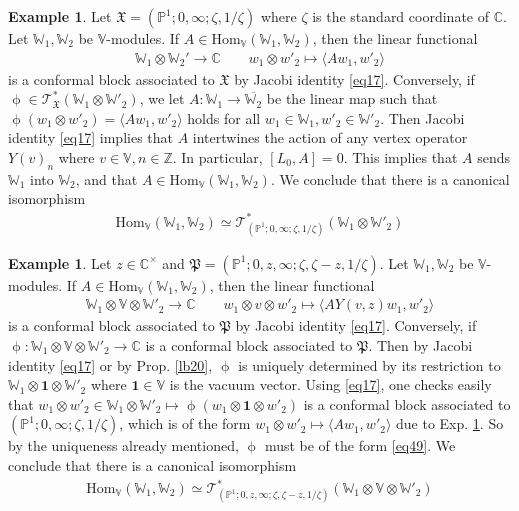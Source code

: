 \documentclass[11pt,b5paper,notitlepage]{article}
\theoremstyle{definition}
\newtheorem{eg}[df]{Example}
\theoremstyle{plain}
\newcommand{\fk}{\mathfrak}
\newcommand{\ovl}{\overline}
\newcommand{\id}{\mathbf{1}}
\newcommand{\Hom}{\mathrm{Hom}}
\newcommand{\bk}[1]{\langle {#1}\rangle}
\newcommand{\scr}{\mathscr}
\newcommand{\Vbb}{\mathbb V}
\newcommand{\Wbb}{\mathbb W}
\newcommand{\Cbb}{\mathbb C}
\newcommand{\Zbb}{\mathbb Z}
\newcommand{\Pbb}{\mathbb P}
\numberwithin{equation}{section}
\begin{document}
\begin{eg}\label{lb30}
Let $\fk X=(\Pbb^1;0,\infty;\zeta,1/\zeta)$ where $\zeta$ is the standard coordinate of $\Cbb$. Let $\Wbb_1,\Wbb_2$ be $\Vbb$-modules. If $A\in\Hom_\Vbb(\Wbb_1,\Wbb_2)$, then the linear functional
\begin{align*}
\Wbb_1\otimes\Wbb_2'\rightarrow\Cbb\qquad w_1\otimes w'_2\mapsto\bk{Aw_1,w'_2}
\end{align*}
is a conformal block associated to $\fk X$ by  Jacobi identity \eqref{eq17}. Conversely, if $\upphi\in\scr T_{\fk X}^*(\Wbb_1\otimes\Wbb'_2)$, we let $A:\Wbb_1\rightarrow \ovl{\Wbb_2}$ be the linear map such that $\upphi(w_1\otimes w'_2)=\bk{Aw_1,w'_2}$ holds for all $w_1\in\Wbb_1,w'_2\in\Wbb'_2$. Then Jacobi identity \eqref{eq17} implies that $A$ intertwines the action of any vertex operator $Y(v)_n$ where $v\in\Vbb,n\in\Zbb$. In particular, $[L_0,A]=0$. This implies that $A$ sends $\Wbb_1$ into $\Wbb_2$, and that $A\in\Hom_\Vbb(\Wbb_1,\Wbb_2)$. We conclude that there is a canonical isomorphism
\begin{align*}
\Hom_\Vbb(\Wbb_1,\Wbb_2)\simeq \scr T_{(\Pbb^1;0,\infty;\zeta,1/\zeta)}^*(\Wbb_1\otimes\Wbb'_2)
\end{align*}
\end{eg}


\begin{eg}\label{lb31}
Let $z\in\Cbb^\times$ and $\fk P=(\Pbb^1;0,z,\infty;\zeta,\zeta-z,1/\zeta)$. Let $\Wbb_1,\Wbb_2$ be $\Vbb$-modules. If $A\in\Hom_\Vbb(\Wbb_1,\Wbb_2)$, then the linear functional
\begin{align}
\Wbb_1\otimes\Vbb\otimes\Wbb'_2\rightarrow\Cbb   \qquad   w_1\otimes v\otimes w'_2\mapsto \bk{AY(v,z)w_1,w'_2}   \label{eq49}
\end{align}
is a conformal block associated to $\fk P$ by Jacobi identity \eqref{eq17}. Conversely, if $\upphi:\Wbb_1\otimes\Vbb\otimes\Wbb'_2\rightarrow\Cbb$ is a conformal block associated to $\fk P$. Then by Jacobi identity \eqref{eq17} or by Prop. \ref{lb20}, $\upphi$ is uniquely determined by its restriction to $\Wbb_1\otimes\id\otimes\Wbb'_2$ where $\id\in\Vbb$ is the vacuum vector. Using \eqref{eq17}, one checks easily that $w_1\otimes w'_2\in\Wbb_1\otimes\Wbb'_2\mapsto \upphi(w_1\otimes\id\otimes w'_2)$ is a conformal block associated to $(\Pbb^1;0,\infty;\zeta,1/\zeta)$, which is of the form $w_1\otimes w'_2\mapsto \bk{Aw_1,w'_2}$ due to Exp. \ref{lb30}. So by the uniqueness already mentioned, $\upphi$ must be of the form \eqref{eq49}. We conclude that there is a canonical isomorphism
\begin{align*}
\Hom_\Vbb(\Wbb_1,\Wbb_2)\simeq \scr T_{(\Pbb^1;0,z,\infty;\zeta,\zeta-z,1/\zeta)}^*(\Wbb_1\otimes\Vbb\otimes\Wbb'_2)
\end{align*}
\end{eg}
\end{document}

